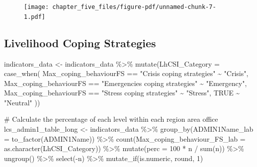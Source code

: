 \documentclass[
  letterpaper,
  DIV=11,
  numbers=noendperiod]{scrreprt}
\newenvironment{Shaded}{\begin{snugshade}}{\end{snugshade}}
\newcommand{\AttributeTok}[1]{\textcolor[rgb]{0.40,0.45,0.13}{#1}}
\newcommand{\CommentTok}[1]{\textcolor[rgb]{0.37,0.37,0.37}{#1}}
\newcommand{\ConstantTok}[1]{\textcolor[rgb]{0.56,0.35,0.01}{#1}}
\newcommand{\DecValTok}[1]{\textcolor[rgb]{0.68,0.00,0.00}{#1}}
\newcommand{\FunctionTok}[1]{\textcolor[rgb]{0.28,0.35,0.67}{#1}}
\newcommand{\NormalTok}[1]{\textcolor[rgb]{0.00,0.23,0.31}{#1}}
\newcommand{\OtherTok}[1]{\textcolor[rgb]{0.00,0.23,0.31}{#1}}
\newcommand{\SpecialCharTok}[1]{\textcolor[rgb]{0.37,0.37,0.37}{#1}}
\newcommand{\StringTok}[1]{\textcolor[rgb]{0.13,0.47,0.30}{#1}}
\begin{document}
\begin{figure}[H]

{\centering \texttt{[image: chapter\_five\_files/figure-pdf/unnamed-chunk-7-1.pdf]}

}

\end{figure}

\hypertarget{livelihood-coping-strategies}{%
\subsection{Livelihood Coping
Strategies}\label{livelihood-coping-strategies}}

\begin{Shaded}
\begin{Highlighting}[]
\NormalTok{indicators\_data }\OtherTok{\textless{}{-}}\NormalTok{ indicators\_data }\SpecialCharTok{\%\textgreater{}\%} 
  \FunctionTok{mutate}\NormalTok{(}\AttributeTok{LhCSI\_Category =} \FunctionTok{case\_when}\NormalTok{(}
\NormalTok{    Max\_coping\_behaviourFS }\SpecialCharTok{==} \StringTok{"Crisis coping strategies"} \SpecialCharTok{\textasciitilde{}} \StringTok{"Crisis"}\NormalTok{,}
\NormalTok{    Max\_coping\_behaviourFS }\SpecialCharTok{==} \StringTok{"Emergencies coping strategies"} \SpecialCharTok{\textasciitilde{}} \StringTok{"Emergency"}\NormalTok{,}
\NormalTok{    Max\_coping\_behaviourFS }\SpecialCharTok{==} \StringTok{"Stress coping strategies"} \SpecialCharTok{\textasciitilde{}} \StringTok{"Stress"}\NormalTok{,}
    \ConstantTok{TRUE} \SpecialCharTok{\textasciitilde{}} \StringTok{"Neutral"}
\NormalTok{  ))}


\CommentTok{\# Calculate the percentage of each level within each region area office}
\NormalTok{lcs\_admin1\_table\_long }\OtherTok{\textless{}{-}}\NormalTok{ indicators\_data }\SpecialCharTok{\%\textgreater{}\%} 
  \FunctionTok{group\_by}\NormalTok{(}\AttributeTok{ADMIN1Name\_lab =} \FunctionTok{to\_factor}\NormalTok{(ADMIN1Name)) }\SpecialCharTok{\%\textgreater{}\%}
  \FunctionTok{count}\NormalTok{(}\AttributeTok{Max\_coping\_behaviour\_FS\_lab =} \FunctionTok{as.character}\NormalTok{(LhCSI\_Category)) }\SpecialCharTok{\%\textgreater{}\%}
  \FunctionTok{mutate}\NormalTok{(}\AttributeTok{perc =} \DecValTok{100} \SpecialCharTok{*}\NormalTok{ n }\SpecialCharTok{/} \FunctionTok{sum}\NormalTok{(n)) }\SpecialCharTok{\%\textgreater{}\%}
  \FunctionTok{ungroup}\NormalTok{() }\SpecialCharTok{\%\textgreater{}\%} \FunctionTok{select}\NormalTok{(}\SpecialCharTok{{-}}\NormalTok{n) }\SpecialCharTok{\%\textgreater{}\%} \FunctionTok{mutate\_if}\NormalTok{(is.numeric, round, }\DecValTok{1}\NormalTok{) }


\end{Highlighting}
\end{Shaded}
\end{document}
